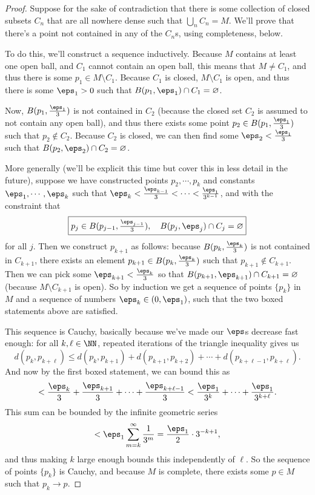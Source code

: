 \begin{proof}
Suppose for the sake of contradiction that there is some collection of closed subsets $C_n$ that are all nowhere dense such that $\bigcup_n C_n = M$. We'll prove that there's a point not contained in any of the $C_n$s, using completeness, below.

To do this, we'll construct a sequence inductively. Because $M$ contains at least one open ball, and $C_1$ cannot contain an open ball, this means that $M \ne C_1$, and thus there is some $p_1 \in M \setminus C_1$. Because $C_1$ is closed, $M \setminus C_1$ is open, and thus there is some $\eps_1 > 0$ such that $B(p_1, \eps_1) \cap C_1 = \varnothing$.

Now, $B(p_1, \frac{\eps_1}{3})$ is not contained in $C_2$ (because the closed set $C_2$ is assumed to not contain any open ball), and thus there exists some point $p_2 \in B(p_1, \frac{\eps_1}{3})$ such that $p_2 \not\in C_2$. Because $C_2$ is closed, we can then find some $\eps_2 < \frac{\eps_1}{3}$ such that $B(p_2, \eps_2) \cap C_2 = \varnothing$.

More generally (we'll be explicit this time but cover this in less detail in the future), suppose we have constructed points $p_2, \cdots, p_k$ and constants $\eps_1, \cdots, \eps_k$ such that $\eps_k < \frac{\eps_{k-1}}{3} < \cdots < \frac{\eps_1}{3^{k-1}}$, and with the constraint that 
\[
    \boxed{p_j \in B(p_{j-1}, \tfrac{\eps_{j-1}}{3}), \quad B(p_j, \eps_j) \cap C_j = \varnothing}
\]
for all $j$. Then we construct $p_{k+1}$ as follows: because $B(p_k, \frac{\eps_k}{3})$ is not contained in $C_{k+1}$, there exists an element $p_{k+1} \in B(p_k, \frac{\eps_k}{3})$ such that $p_{k+1} \not\in C_{k+1}$. Then we can pick some $\eps_{k+1} < \frac{\eps_k}{3}$ so that $B(p_{k+1}, \eps_{k+1}) \cap C_{k+1} = \varnothing$ (because $M \setminus C_{k+1}$ is open). So by induction we get a sequence of points $\{p_k\}$ in $M$ and a sequence of numbers $\eps_k \in (0, \eps_1)$, such that the two boxed statements above are satisfied.

This sequence is Cauchy, basically because we've made our $\eps$s decrease fast enough: for all $k, \ell \in \NN$, repeated iterations of the triangle inequality gives us
\[
    d(p_k, p_{k+\ell}) \le d(p_k, p_{k+1}) + d(p_{k+1}, p_{k+2}) + \cdots + d(p_{k+\ell-1}, p_{k+\ell}).
\]
And now by the first boxed statement, we can bound this as 
\[
     < \frac{\eps_k}{3} + \frac{\eps_{k+1}}{3} + \cdots + \frac{\eps_{k+\ell-1}}{3} < \frac{\eps_1}{3^k} + \cdots + \frac{\eps_1}{3^{k+\ell}}.
\]
This sum can be bounded by the infinite geometric series 
\[
    < \eps_1 \sum_{m=k}^{\infty} \frac{1}{3^m} = \frac{\eps_1}{2} \cdot 3^{-k+1},
\]
and thus making $k$ large enough bounds this independently of $\ell$. So the sequence of points $\{p_k\}$ is Cauchy, and because $M$ is complete, there exists some $p \in M$ such that $p_k \to p$.


\end{proof}
